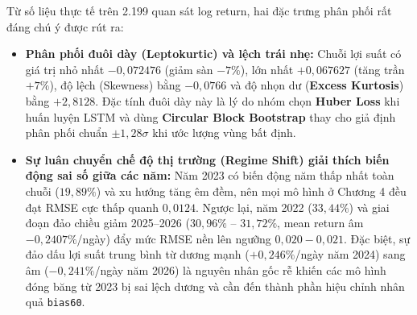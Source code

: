 \documentclass[12pt,a4paper]{report}
\begin{document}
Từ số liệu thực tế trên 2.199 quan sát log return, hai đặc trưng phân phối rất đáng chú ý được rút ra:
\begin{itemize}
    \item \textbf{Phân phối đuôi dày (Leptokurtic) và lệch trái nhẹ:} Chuỗi lợi suất có giá trị nhỏ nhất $-0,072476$ (giảm sàn $-7\%$), lớn nhất $+0,067627$ (tăng trần $+7\%$), độ lệch (Skewness) bằng $-0,0766$ và độ nhọn dư (\textbf{Excess Kurtosis}) bằng \textbf{$+2,8128$}. Đặc tính đuôi dày này là lý do nhóm chọn \textbf{Huber Loss} khi huấn luyện LSTM và dùng \textbf{Circular Block Bootstrap} thay cho giả định phân phối chuẩn $\pm 1,28\sigma$ khi ước lượng vùng bất định.
    \item \textbf{Sự luân chuyển chế độ thị trường (Regime Shift) giải thích biến động sai số giữa các năm:} Năm 2023 có biến động năm thấp nhất toàn chuỗi ($19,89\%$) và xu hướng tăng êm đềm, nên mọi mô hình ở Chương 4 đều đạt RMSE cực thấp quanh $0,0124$. Ngược lại, năm 2022 ($33,44\%$) và giai đoạn đảo chiều giảm 2025--2026 ($30,96\%$ -- $31,72\%$, mean return âm $-0,2407\%$/ngày) đẩy mức RMSE nền lên ngưỡng $0,020 - 0,021$. Đặc biệt, sự đảo dấu lợi suất trung bình từ dương mạnh ($+0,246\%$/ngày năm 2024) sang âm ($-0,241\%$/ngày năm 2026) là nguyên nhân gốc rễ khiến các mô hình đóng băng từ 2023 bị sai lệch dương và cần đến thành phần hiệu chỉnh nhân quả \texttt{bias60}.
\end{itemize}
\end{document}
